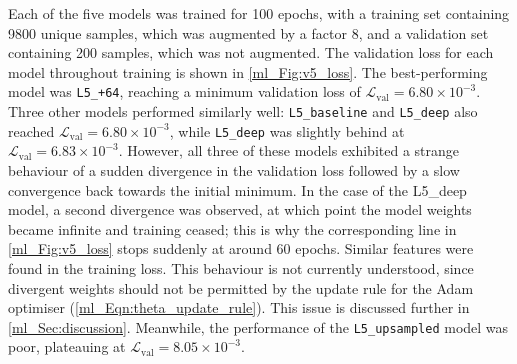 Each of the five models was trained for 100 epochs, with a training set containing 9800 unique samples, which was augmented by a factor 8, and a validation set containing 200 samples, which was not augmented. The validation loss for each model throughout training is shown in \autoref{ml_Fig:v5_loss}. The best-performing model was \texttt{L5\_+64}, reaching a minimum validation loss of $\mathcal{L}_\text{val} = 6.80 \times 10^{-3}$. Three other models performed similarly well: \texttt{L5\_baseline} and \texttt{L5\_deep} also reached $\mathcal{L}_\text{val} = 6.80 \times 10^{-3}$, while \texttt{L5\_deep} was slightly behind at $\mathcal{L}_\text{val} = 6.83 \times 10^{-3}$. However, all three of these models exhibited a strange behaviour of a sudden divergence in the validation loss followed by a slow convergence back towards the initial minimum. In the case of the {L5\_deep} model, a second divergence was observed, at which point the model weights became infinite and training ceased; this is why the corresponding line in \autoref{ml_Fig:v5_loss} stops suddenly at around 60 epochs. Similar features were found in the training loss. This behaviour is not currently understood, since divergent weights should not be permitted by the update rule for the Adam optimiser (\autoref{ml_Eqn:theta_update_rule}). This issue is discussed further in \autoref{ml_Sec:discussion}. Meanwhile, the performance of the \texttt{L5\_upsampled} model was poor, plateauing at $\mathcal{L}_\text{val} = 8.05 \times 10^{-3}$.

